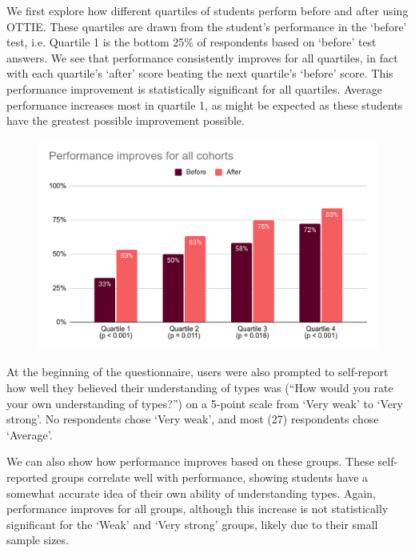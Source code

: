 \documentclass[a4paper,fleqn,oneside,12pt]{report}
\begin{document}
We first explore how different quartiles of students perform before and after using OTTIE. These quartiles are drawn from the student's performance in the `before' test, i.e. Quartile 1 is the bottom 25\% of respondents based on `before' test answers. We see that performance consistently improves for all quartiles, in fact with each quartile's `after' score beating the next quartile's `before' score. This performance improvement is statistically significant for all quartiles. Average performance increases most in quartile 1, as might be expected as these students have the greatest possible improvement possible.

{\centering \begin{figure}[h!]
  \centering
  \includegraphics[width=0.85\linewidth]{images/image20.png}
  \label{figure:evaluation_testperformancecohorts}
\end{figure} \par}

At the beginning of the questionnaire, users were also prompted to self-report how well they believed their understanding of types was (``How would you rate your own understanding of types?'') on a 5-point scale from `Very weak' to `Very strong'. No respondents chose ‘Very weak’, and most (27) respondents chose `Average'.

We can also show how performance improves based on these groups. These self-reported groups correlate well with performance, showing students have a somewhat accurate idea of their own ability of understanding types. Again, performance improves for all groups, although this increase is not statistically significant for the `Weak' and `Very strong' groups, likely due to their small sample sizes.
\end{document}
